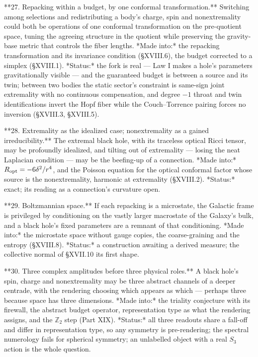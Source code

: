 **27. Repacking within a budget, by one conformal transformation.** Switching among selections and redistributing a body's charge, spin and nonextremality could both be operations of one conformal transformation on the pre-quotient space, tuning the agreeing structure in the quotient while preserving the gravity-base metric that controls the fiber lengths. *Made into:* the repacking transformation and its invariance condition (§XVIII.6), the budget corrected to a simplex (§XVIII.1). *Status:* the fork is real — Law I makes a hole's parameters gravitationally visible — and the guaranteed budget is between a source and its twin; between two bodies the static sector's constraint is same-sign joint extremality with no continuous compensation, and degree $-1$ throat and twin identifications invert the Hopf fiber while the Couch–Torrence pairing forces no inversion (§XVIII.3, §XVIII.5).

**28. Extremality as the idealized case; nonextremality as a gained irreducibility.** The extremal black hole, with its traceless optical Ricci tensor, may be profoundly idealized, and tilting out of extremality — losing the neat Laplacian condition — may be the beefing-up of a connection. *Made into:* $R_{\rm opt} = -6\delta^2/r^4$, and the Poisson equation for the optical conformal factor whose source is the nonextremality, harmonic at extremality (§XVIII.2). *Status:* exact; its reading as a connection's curvature open.

**29. Boltzmannian space.** If each repacking is a microstate, the Galactic frame is privileged by conditioning on the vastly larger macrostate of the Galaxy's bulk, and a black hole's fixed parameters are a remnant of that conditioning. *Made into:* the microstate space without gauge copies, the coarse-graining and the entropy (§XVIII.8). *Status:* a construction awaiting a derived measure; the collective normal of §XVII.10 its first shape.

**30. Three complex amplitudes before three physical roles.** A black hole's spin, charge and nonextremality may be three abstract channels of a deeper centrade, with the rendering choosing which appears as which — perhaps three because space has three dimensions. *Made into:* the triality conjecture with its firewall, the abstract budget operator, representation type as what the rendering assigns, and the $\mathbb Z_2$ step (Part XIX). *Status:* all three readouts share a fall-off and differ in representation type, so any symmetry is pre-rendering; the spectral numerology fails for spherical symmetry; an unlabelled object with a real $S_3$ action is the whole question.


